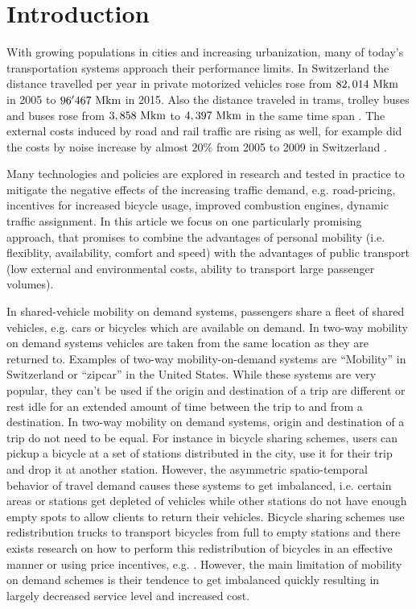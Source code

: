 \section{Introduction}

With growing populations in cities and increasing urbanization, many of today's transportation systems approach their performance limits. In Switzerland the distance travelled per year in private motorized vehicles rose from $82,014 ~ \textnormal{Mkm}$ in 2005 to $96'467 ~\textnormal{Mkm}$ in 2015. Also the distance traveled in trams, trolley buses and buses rose from $3,858 ~ \textnormal{Mkm}$ to $4,397 ~ \textnormal{Mkm}$ in the same time span \cite{BFSVerkehrsvolumen}. The external costs induced by road and rail traffic are rising as well, for example did the costs by noise increase by almost $20 \%$ from 2005 to 2009 in Switzerland \cite{AREexterneKosten}.

Many technologies and policies are explored in research and tested in practice to mitigate the negative effects of the increasing traffic demand, e.g. road-pricing, incentives for increased bicycle usage, improved combustion engines, dynamic traffic assignment. In this article we focus on one particularly promising approach, that promises to combine the advantages of personal mobility (i.e. flexiblity, availability, comfort and speed) with the advantages of public transport (low external and environmental costs, ability to transport large passenger volumes).

In shared-vehicle mobility on demand systems, passengers share a fleet of shared vehicles, e.g. cars or bicycles which are available on demand. In two-way mobility on demand systems vehicles are taken from the same location as they are returned to. Examples of two-way mobility-on-demand systems are ``Mobility'' in Switzerland or ``zipcar'' in the United States. While these systems are very popular, they can't be used if the origin and destination of a trip are different or rest idle for an extended amount of time between the trip to and from a destination. In two-way mobility on demand systems, origin and destination of a trip do not need to be equal. For instance in bicycle sharing schemes, users can pickup a bicycle at a set of stations distributed in the city, use it for their trip and drop it at another station. However, the asymmetric spatio-temporal behavior of travel demand causes these systems to get imbalanced, i.e. certain areas or stations get depleted of vehicles while other stations do not have enough empty spots to allow clients to return their vehicles. Bicycle sharing schemes use redistribution trucks to transport bicycles from full to empty stations and there exists research on how to perform this redistribution of bicycles in an effective manner or using price incentives, e.g. \cite{ruch2014rule}. However, the main limitation of mobility on demand schemes is their tendence to get imbalanced quickly resulting in largely decreased service level and increased cost.



